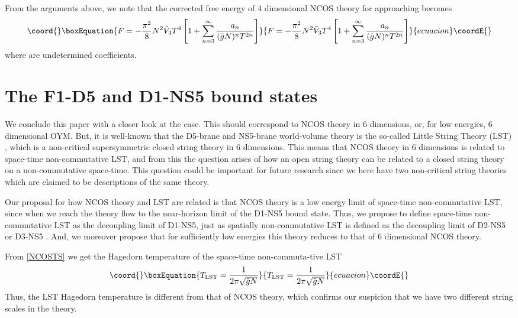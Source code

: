 \documentclass[a4paper,twoside,titlepage,12pt]{article}
\begin{document}
From the arguments above, we note that 
the corrected free energy of 4 dimensional NCOS theory
for \coordHE{} approaching \coordHE{} becomes
%
\begin{equation}\coord{}\boxEquation{
F = - \frac{\pi^2}{8} N^2 \tilde{V}_3 T^4 \left[
1+ \sum_{n=3}^\infty \frac{a_n}{(\tilde{g} N)^n T^{2n}}  \right]
}{
F = - \frac{\pi^2}{8} N^2 \tilde{V}_3 T^4 \left[
1+ \sum_{n=3}^\infty \frac{a_n}{(\tilde{g} N)^n T^{2n}}  \right]
}{ecuacion}\coordE{}\end{equation}
%
where \coordHE{} are undetermined coefficients.

\section{The F1-D5 and D1-NS5 bound states}
\label{secp5}


We conclude this paper with a closer look at the \coordHE{} case. 
This should correspond to NCOS theory in 6 dimensions, or, for low
energies, 6 dimensional OYM. 
But, it is well-known that the D5-brane and NS5-brane world-volume
theory is the so-called Little String Theory (LST) 
\cite{Seiberg:1997zk,Berkooz:1997cq,Losev:1997hx}, which
is a non-critical supersymmetric closed string theory in 6 dimensions.
This means that NCOS theory in 6 dimensions is related to space-time
non-commutative LST, and from this the question arises 
of how an open string theory can be related to a closed string theory
on a non-commutative space-time.
This question could be important for future research since we here
have two non-critical string theories which are claimed
to be descriptions of the same theory. 


Our proposal for how NCOS theory and LST are related is that NCOS theory is a low energy
limit of space-time non-commutative LST, since when we reach 
\coordHE{} the theory flow to the near-horizon
limit of the D1-NS5 bound state. 
Thus, we propose to define space-time non-commutative LST as the
decoupling limit of D1-NS5, just as spatially non-commutative LST
is defined as the decoupling limit of D2-NS5 or D3-NS5 
\cite{Alishahiha:2000er}.
And, we moreover propose that for sufficiently low energies this
theory reduces to that of 6 dimensional NCOS theory.


From \eqref{NCOSTS} we get the Hagedorn temperature
of the space-time non-commuta{-}tive LST
%
\begin{equation}\coord{}\boxEquation{
\tlst = \frac{1}{2\pi\sqrt{\tilde{g}N} }
}{
\tlst = \frac{1}{2\pi\sqrt{\tilde{g}N} }
}{ecuacion}\coordE{}\end{equation}
%
Thus, the LST Hagedorn temperature is different from that of NCOS theory,
which confirms our suspicion that we have two different string scales
in the theory.
\end{document}

